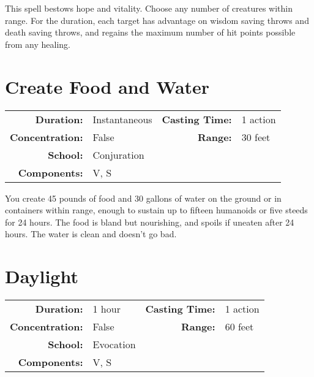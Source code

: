 \documentclass[a5paper, 12pt]{memoir}
\begin{document}
\vspace{1\baselineskip}\noindent This spell bestows hope and vitality. Choose any number of creatures within range. For the duration, each target has advantage on wisdom saving throws and death saving throws, and regains the maximum number of hit points possible from any healing.

\newpage
\section*{Create Food and Water}

{
\small\centering\vspace{-6pt}
\begin{tabular}{rlrl}
\toprule

\textbf{Duration:} & Instantaneous &
\textbf{Casting Time:} & 1 action \\
\textbf{Concentration:} & False &
\textbf{Range:} & 30 feet \\
\textbf{School:} & Conjuration \\
\textbf{Components:} & \multicolumn{3}{p{0.7\textwidth}}{V, S}\\

\bottomrule
\end{tabular}
}

\vspace{1\baselineskip}\noindent You create 45 pounds of food and 30 gallons of water on the ground or in containers within range, enough to sustain up to fifteen humanoids or five steeds for 24 hours. The food is bland but nourishing, and spoils if uneaten after 24 hours. The water is clean and doesn't go bad.

\newpage
\section*{Daylight}

{
\small\centering\vspace{-6pt}
\begin{tabular}{rlrl}
\toprule

\textbf{Duration:} & 1 hour &
\textbf{Casting Time:} & 1 action \\
\textbf{Concentration:} & False &
\textbf{Range:} & 60 feet \\
\textbf{School:} & Evocation \\
\textbf{Components:} & \multicolumn{3}{p{0.7\textwidth}}{V, S}\\

\bottomrule
\end{tabular}
}
\end{document}
